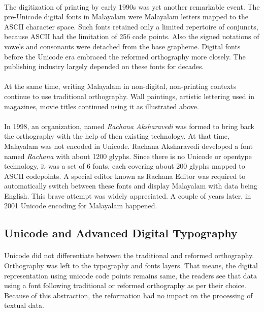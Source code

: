 \documentclass[10pt]{article}
\begin{document}
\paragraph{}
The digitization of printing by early 1990s was yet another remarkable event. The pre-Unicode digital fonts in Malayalam were Malayalam letters mapped to the ASCII character space. Such fonts retained only a limited repertoire of conjuncts, because ASCII had the limitation of 256 code points. Also the signed notations of vowels and consonants were detached from the base grapheme. Digital fonts before the Unicode era embraced the reformed orthography more closely. The publishing industry largely depended on these fonts for decades.

\paragraph{}
At the same time, writing Malayalam in non-digital, non-printing contexts continue to use traditional orthography. Wall paintings, artistic lettering used in magazines, movie titles continued using it as illustrated above.

\paragraph{}
In 1998, an organization, named \textit{Rachana Aksharavedi} was formed to bring back the orthography with the help of then existing technology. At that time, Malayalam was not encoded in Unicode. Rachana Aksharavedi developed a font named \textit{Rachana} with about 1200 glyphs. Since there is no Unicode or opentype technology, it was a set of 6 fonts, each covering about 200 glyphs mapped to ASCII codepoints. A special editor known as Rachana Editor was required to automatically switch between these fonts and display Malayalam with data being English. This brave attempt was widely appreciated. A couple of years later, in 2001 Unicode encoding for Malayalam happened.

\subsection{Unicode and Advanced Digital Typography}

\paragraph{}
Unicode did not differentiate between the traditional and reformed orthography. Orthography was left to the typography and fonts layers. That means, the digital representation using unicode code points remains same, the readers see that data using a font following traditional or reformed orthography as per their choice. Because of this abstraction, the reformation had no impact on the processing of textual data.
\end{document}

